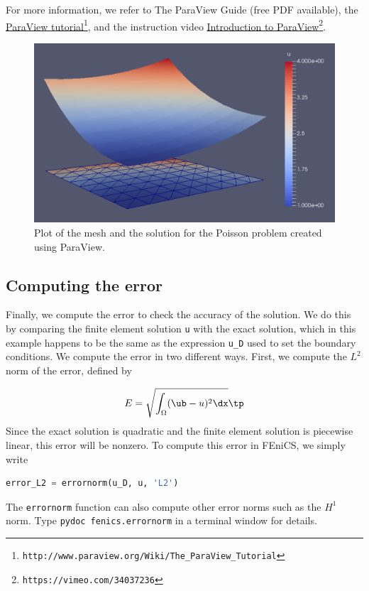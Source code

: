 \documentclass[graybox,envcountchap,sectrefs,final]{svmonodo}
\begin{document}
\noindent
For more information, we refer to The ParaView Guide \cite{Paraview}
(free PDF available), the \href{{http://www.paraview.org/Wiki/The_ParaView_Tutorial}}{ParaView tutorial}\footnote{\texttt{http://www.paraview.org/Wiki/The\_ParaView\_Tutorial}}, and the instruction
video \href{{https://vimeo.com/34037236}}{Introduction to ParaView}\footnote{\texttt{https://vimeo.com/34037236}}.


\begin{figure}[!ht]  %
  \centerline{\includegraphics[width=0.95\linewidth]{fig/poisson_paraview.png}}
  \caption{
  Plot of the mesh and the solution for the Poisson problem created using ParaView. \label{fig:poisson_paraview}
  }
\end{figure}


\subsection{Computing the error}


Finally, we compute the error to check the accuracy of the solution.
We do this by comparing the finite element solution \texttt{u} with the exact
solution, which in this example happens to be the same as the
expression \Verb!u_D! used to set the boundary conditions. We compute the
error in two different ways. First, we compute the $L^2$ norm of the
error, defined by

\[ E = \sqrt{\int_\Omega (\ub - u)^2\dx}\tp\]
Since the exact solution is quadratic and the finite element solution
is piecewise linear, this error will be nonzero. To compute this error
in FEniCS, we simply write

\begin{lstlisting}[language=Python,style=graycolor]
error_L2 = errornorm(u_D, u, 'L2')
\end{lstlisting}
The \texttt{errornorm} function can also compute other error norms such
as the $H^1$ norm. Type \texttt{pydoc fenics.errornorm} in a terminal window
for details.
\end{document}
